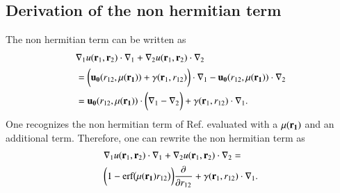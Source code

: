 \documentclass[aip,jcp,reprint,noshowkeys,superscriptaddress]{revtex4-1}
\newcommand{\deriv}[3]{\frac{\partial^{#3} #1}{\partial {#2}^{#3}}}
\newcommand{\br}[0]{{\bf {r}}}
\newcommand{\bri}[1]{{\bf r}_{#1}}
\newcommand{\mur}[1]{\mu({\bf r_{#1}})}
\begin{document}
\subsection{Derivation of the non hermitian term}
The non hermitian term can be written as 
\begin{equation}
 \begin{aligned}
&  \nabla_1 u(\bri{1},\bri{2}) \cdot \nabla_1 + \nabla_2 u(\bri{1},\bri{2}) \cdot \nabla_2 \\
& = \bigg( {\bf u_0}(r_{12},\mur{1}) + {\bf \gamma}(\br_1, r_{12}) \bigg) \cdot \nabla_1 - {\bf u_0}(r_{12},\mur{1}) \cdot \nabla_2 \\
& = {\bf u_0}(r_{12},\mur{1}) \cdot \bigg( \nabla_1 - \nabla_2 \bigg) + {\bf \gamma}(\br_1, r_{12}) \cdot \nabla_1. 
 \end{aligned}
\end{equation}
One recognizes the non hermitian term of Ref.  evaluated with a $\mur{1}$ and an additional term. 
Therefore, one can rewrite the non hermitian term as 
\begin{equation}
 \begin{aligned}
 &\nabla_1 u(\bri{1},\bri{2}) \cdot \nabla_1 + \nabla_2 u(\bri{1},\bri{2}) \cdot \nabla_2 = \\
& \bigg( 1 - \text{erf}\big(\mur{1} r_{12} \big) \bigg) \deriv{}{r_{12}}{} + {\bf \gamma}(\br_1, r_{12}) \cdot \nabla_1. 
 \end{aligned}
\end{equation}
\end{document}
